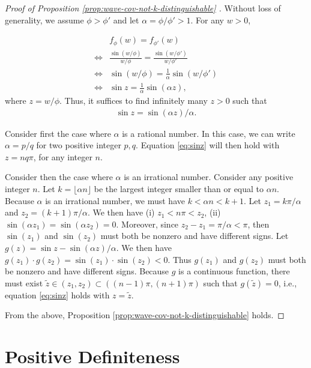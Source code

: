 \documentclass[11pt]{article}
\theoremstyle{definition}
\theoremstyle{remark}
\begin{document}
\begin{proof}[Proof of Proposition \ref{prop:wave-cov-not-k-distinguishable} ]
Without loss of generality, we assume $\phi > \phi'$ and let $\alpha = \phi/\phi' >1$.
For any $w>0$, 

\begin{align*}
& f_{\phi}(w) = f_{\phi'}(w) \\ \iff &
\frac{\sin(w/\phi)}{w/\phi} = \frac{ \sin(w/\phi')}{w/\phi'}\\ \iff &\sin(w/\phi) = \frac{1}{\alpha} \sin(w/\phi')\\
\iff &
\sin z = \frac{1}{\alpha}\sin (\alpha z),  
\end{align*}
where $z=w/\phi$. 
Thus, it suffices to find infinitely many $z>0$ such that 
\begin{align}\label{eq:sinz}
    \sin z = \sin (\alpha z)/\alpha. 
\end{align}




Consider first the case where $\alpha$ is a rational number. 
In this case, we can write $\alpha = p/q$ for two positive integer $p, q$. 
Equation \eqref{eq:sinz} will then hold  with $z = nq\pi$, for any integer $n$.  




Consider then the case where $\alpha$ is an irrational number. 
Consider any positive integer $n$. 
Let $k= \lfloor \alpha n \rfloor$ be the largest integer smaller than or equal to $\alpha n$. 
Because $\alpha$ is an irrational number, we must have $k < \alpha n < k+1$. 
Let $z_1 = k\pi/\alpha$ and  $z_2 = (k+1)\pi/\alpha$. 
We then have (i) $z_1 < n \pi < z_2$, 
(ii) $\sin (\alpha z_1) = \sin (\alpha z_2) = 0$. 
Moreover, since $z_2 - z_1 = \pi/\alpha < \pi$, then $\sin(z_1)$ and $\sin(z_2)$ must both be nonzero and have different signs. 
Let $g(z) =  \sin z - \sin (\alpha z)/\alpha$. 
We then have 
$g(z_1) \cdot g(z_2) = \sin(z_1) \cdot \sin(z_2) < 0$. Thus $g(z_1)$ and $g(z_2)$ must both be nonzero and have different signs.
Because $g$ is a continuous function, there must exist $\tilde{z} \in (z_1, z_2) \subset ((n-1)\pi, (n+1)\pi)$ such that $g(\tilde{z})=0$, i.e., equation \eqref{eq:sinz} holds with $z=\tilde{z}$.  







From the above, Proposition \ref{prop:wave-cov-not-k-distinguishable} holds. 
\end{proof}

\section{Positive Definiteness}\label{sec:pd}
\end{document}
